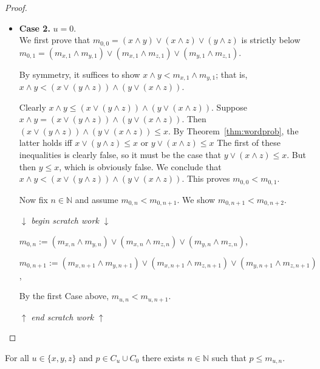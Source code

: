 \begin{proof}
\begin{itemize}
\item \textbf{Case 2.} $u = 0$.\\
  We first prove that $m_{0, 0} = (x\wedge y) \vee (x\wedge z)\vee (y\wedge z)$ is strictly below $m_{0, 1} = 
  (m_{x,1}\wedge m_{y,1}) \vee (m_{x,1}\wedge m_{z,1}) \vee (m_{y,1}\wedge m_{z,1})$.

  By symmetry, it suffices to show $x\wedge y < m_{x,1}\wedge m_{y,1}$;
  that is, $x\wedge y < (x \vee (y\wedge z))\wedge (y \vee (x\wedge z))$.

  Clearly 
  $x\wedge y \leqslant (x \vee (y\wedge z))\wedge (y \vee (x\wedge z))$. Suppose $x\wedge y = (x \vee (y\wedge z))\wedge (y \vee (x\wedge z))$. Then $(x \vee (y\wedge z))\wedge (y \vee (x\wedge z))\leqslant x$.
  By Theorem~\ref{thm:wordprob}, the latter holds iff
  $x \vee (y\wedge z)\leqslant x$ or
  $y \vee (x\wedge z)\leqslant x$
  The first of these inequalities is clearly false, so it must be the case that $y \vee (x\wedge z)\leqslant x$.  But then $y \leqslant x$, which is obviously false.  We conclude that
  $x\wedge y <(x \vee (y\wedge z))\wedge (y \vee (x\wedge z))$.
  This proves $m_{0,0} < m_{0,1}$.

  Now fix $n\in \mathbb{N}$ and assume $m_{0,n} < m_{0,n+1}$.
  We show $m_{0,n+1} < m_{0,n+2}$.

\medskip
  $\downarrow$ \textit{begin scratch work} $\downarrow$

  $m_{0, n} := (m_{x,n} \wedge m_{y,n}) \vee (m_{x,n} \wedge m_{z,n})\vee (m_{y,n} \wedge m_{z,n})$,

  $m_{0, n+1} := (m_{x,n+1} \wedge m_{y,n+1}) \vee (m_{x,n+1} \wedge m_{z,n+1})\vee (m_{y,n+1} \wedge m_{z,n+1})$,

  By the first Case above, $m_{u,n} < m_{u,n+1}$.
  
  $\uparrow$ \textit{end scratch work} $\uparrow$
\end{itemize}
\end{proof}


\begin{lemma}\label{lem:2} %
For all $u \in \{x, y, z\}$ and $p \in C_u \cup C_0$ there exists $n \in \mathbb N$ such that $p\leqslant m_{u,n}$.  
\end{lemma}

